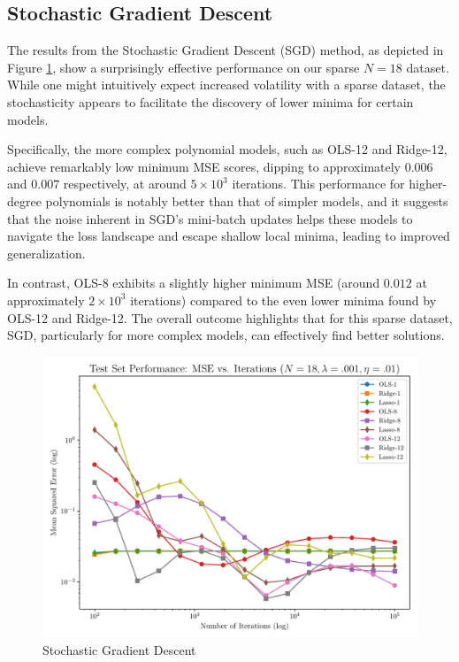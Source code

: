 \documentclass[twocolumn,aps]{revtex4}
\begin{document}
\subsection{Stochastic Gradient Descent}
The results from the Stochastic Gradient Descent (SGD) method, as depicted in Figure \ref{fig:GradSGD}, show a surprisingly effective performance on our sparse $N=18$ dataset. 
While one might intuitively expect increased volatility with a sparse dataset, the stochasticity appears to facilitate the discovery of lower minima for certain models.

Specifically, the more complex polynomial models, such as OLS-12 and Ridge-12, achieve remarkably low minimum MSE scores, dipping to approximately $0.006$ and $0.007$ respectively, at around $5 \times 10^3$ iterations. This performance for higher-degree polynomials is notably better than that of simpler models, and it suggests that the noise inherent in SGD's mini-batch updates helps these models to navigate the loss landscape and escape shallow local minima, leading to improved generalization.

In contrast, OLS-8 exhibits a slightly higher minimum MSE (around $0.012$ at approximately $2 \times 10^3$ iterations) compared to the even lower minima found by OLS-12 and Ridge-12. 
The overall outcome highlights that for this sparse dataset, SGD, particularly for more complex models, can effectively find better solutions.


\begin{figure}[h]
    \centering
    \includegraphics[width=.95 \linewidth]{Figures/StochasticDescent.pdf}
    \caption{Stochastic Gradient Descent}
    \label{fig:GradSGD}
\end{figure}
\end{document}

